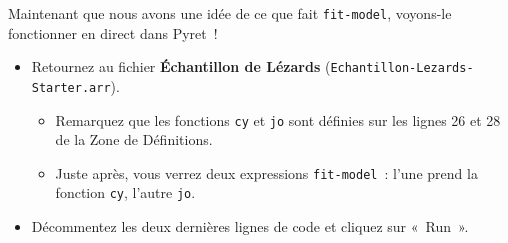 \documentclass[12pt,a4paper]{article}
\begin{document}
\begin{activitybox}
  Maintenant que nous avons une idée de ce que fait \texttt{fit-model}, voyons-le fonctionner en direct dans Pyret~!

  \begin{itemize}
    \item Retournez au fichier \textbf{Échantillon de Lézards} (\texttt{Echantillon\allowbreak-Lezards\allowbreak-Starter.arr}).
    \begin{itemize}
      \item Remarquez que les fonctions \texttt{cy} et \texttt{jo} sont définies sur les lignes 26 et 28 de la Zone de Définitions.
      \item Juste après, vous verrez deux expressions \texttt{fit-model}~: l'une prend la fonction \texttt{cy}, l'autre \texttt{jo}.
    \end{itemize}
    \item Décommentez les deux dernières lignes de code et cliquez sur «~Run~».
  \end{itemize}


\end{activitybox}
\end{document}
